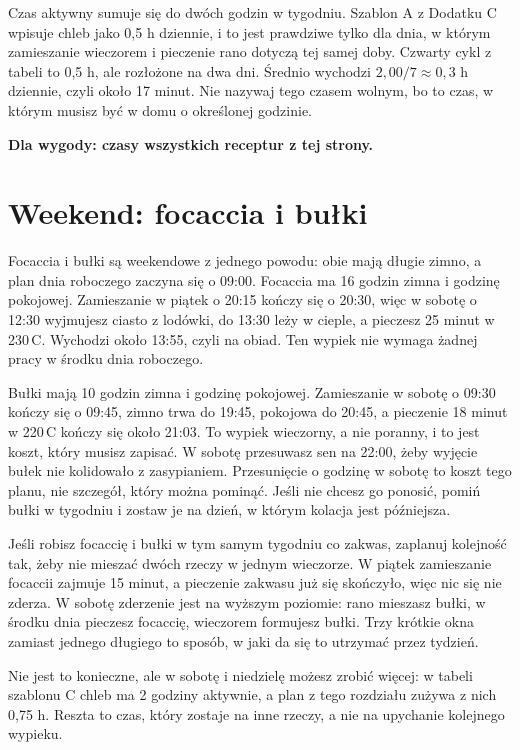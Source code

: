 Czas aktywny sumuje się do dwóch godzin w tygodniu. Szablon A z Dodatku C wpisuje chleb jako 0,5 h dziennie, i to jest prawdziwe tylko dla dnia, w którym zamieszanie wieczorem i pieczenie rano dotyczą tej samej doby. Czwarty cykl z tabeli to 0,5 h, ale rozłożone na dwa dni. Średnio wychodzi \(2{,}00 / 7 \approx 0{,}3\) h dziennie, czyli około 17 minut. Nie nazywaj tego czasem wolnym, bo to czas, w którym musisz być w domu o określonej godzinie.

\begin{center}\small
\textbf{Dla wygody: czasy wszystkich receptur z tej strony.}\\[0.3em]
\end{center}

\section{Weekend: focaccia i bułki}

Focaccia i bułki są weekendowe z jednego powodu: obie mają długie zimno, a plan dnia roboczego zaczyna się o 09:00. Focaccia ma 16 godzin zimna i godzinę pokojowej. Zamieszanie w piątek o 20:15 kończy się o 20:30, więc w sobotę o 12:30 wyjmujesz ciasto z lodówki, do 13:30 leży w cieple, a pieczesz 25 minut w 230\,\textdegree{}C. Wychodzi około 13:55, czyli na obiad. Ten wypiek nie wymaga żadnej pracy w środku dnia roboczego.

Bułki mają 10 godzin zimna i godzinę pokojowej. Zamieszanie w sobotę o 09:30 kończy się o 09:45, zimno trwa do 19:45, pokojowa do 20:45, a pieczenie 18 minut w 220\,\textdegree{}C kończy się około 21:03. To wypiek wieczorny, a nie poranny, i to jest koszt, który musisz zapisać. W sobotę przesuwasz sen na 22:00, żeby wyjęcie bułek nie kolidowało z zasypianiem. Przesunięcie o godzinę w sobotę to koszt tego planu, nie szczegół, który można pominąć. Jeśli nie chcesz go ponosić, pomiń bułki w tygodniu i zostaw je na dzień, w którym kolacja jest późniejsza.

Jeśli robisz focaccię i bułki w tym samym tygodniu co zakwas, zaplanuj kolejność tak, żeby nie mieszać dwóch rzeczy w jednym wieczorze. W piątek zamieszanie focaccii zajmuje 15 minut, a pieczenie zakwasu już się skończyło, więc nic się nie zderza. W sobotę zderzenie jest na wyższym poziomie: rano mieszasz bułki, w środku dnia pieczesz focaccię, wieczorem formujesz bułki. Trzy krótkie okna zamiast jednego długiego to sposób, w jaki da się to utrzymać przez tydzień.

Nie jest to konieczne, ale w sobotę i niedzielę możesz zrobić więcej: w tabeli szablonu C chleb ma 2 godziny aktywnie, a plan z tego rozdziału zużywa z nich 0,75 h. Reszta to czas, który zostaje na inne rzeczy, a nie na upychanie kolejnego wypieku.

